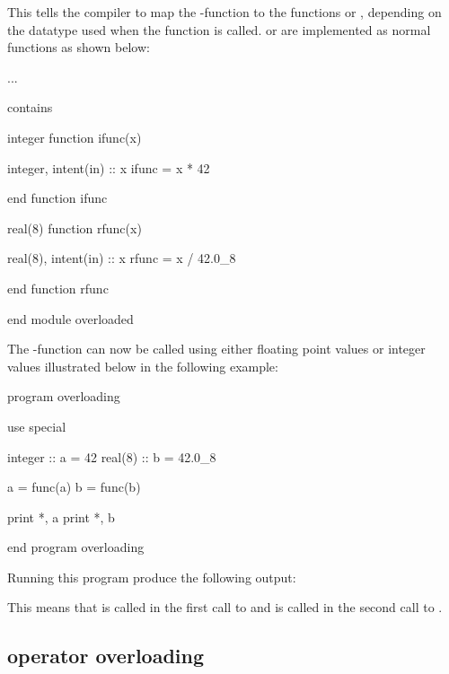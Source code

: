 This tells the compiler to map the -function to the functions  or , depending on the datatype used when the function is called.  or  are implemented as normal functions as shown below:

\begin{fortrancodeenv}
	...
	
contains

integer function ifunc(x)
	
	integer, intent(in) :: x
	ifunc = x * 42
	
end function ifunc

real(8) function rfunc(x)
	
	real(8), intent(in) :: x
	rfunc = x / 42.0_8
	
end function rfunc

end module overloaded
\end{fortrancodeenv}

The -function can now be called using either floating point values or integer values illustrated below in the following example:

\begin{fortrancodeenv}
program overloading

	use special
	
	integer :: a = 42
	real(8) :: b = 42.0_8
	
	a = func(a)
	b = func(b)
	
	print *, a
	print *, b 
	
end program overloading
\end{fortrancodeenv}

Running this program produce the following output:

\cmdmode


\fmode

This means that  is called in the first call to  and  is called in the second call to .

\subsection{operator overloading}

